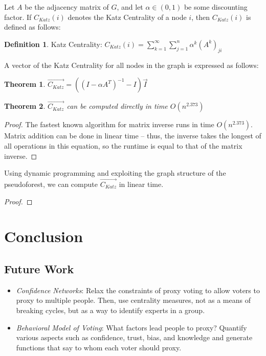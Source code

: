 \documentclass[10pt]{article}
\newtheorem{theorem}{Theorem}[section]
\theoremstyle{definition}
\newtheorem{definition}{Definition}[section]
\begin{document}
Let $A$ be the adjacency matrix of $G$, and let $\alpha \in (0,1)$ be some discounting factor. If $C_{Katz}(i)$ denotes the Katz Centrality of a node $i$, then $C_{Katz}(i)$ is defined as follows:
\theoremstyle{definition}
\begin{definition}{Katz Centrality:}
$C_{Katz}(i) = \sum\limits_{k=1}^{\infty}\sum\limits_{j=1}^n\alpha^k(A^k)_{ji}$
\end{definition}

A vector of the Katz Centrality for all nodes in the graph is expressed as follows:

\begin{theorem}
$\overrightarrow{C_{Katz}}  = ((I - \alpha A^T)^{-1}-I)\vec{I}$
\end{theorem}

\begin{theorem}
$\overrightarrow{C_{Katz}}$ can be computed directly in time $O(n^{2.373})$
\end{theorem}
\begin{proof}
The fastest known algorithm for matrix inverse runs in time $O(n^2.373)$. Matrix addition can be done in linear time -- thus, the inverse takes the longest of all operations in this equation, so the runtime is equal to that of the matrix inverse.
\end{proof}

Using dynamic programming and exploiting the graph structure of the pseudoforest, we can compute $\overrightarrow{C_{Katz}}$ in linear time.
\begin{proof}
\end{proof}



\section{Conclusion}

\subsection{Future Work}
\begin{itemize}
\item \textit{Confidence Networks}: Relax the constraints of proxy voting to allow voters to proxy to multiple people. Then, use centrality measures, not as a means of breaking cycles, but as a way to identify experts in a group.

\item \textit{Behavioral Model of Voting}: What factors lead people to proxy? Quantify various aspects such as confidence, trust, bias, and knowledge and generate functions that say to whom each voter should proxy.
\end{itemize}
\end{document}
